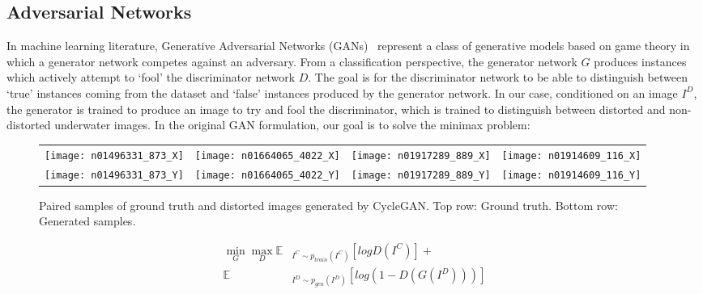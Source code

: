 \subsection{Adversarial Networks}
\label{sec:gans}
In machine learning literature, Generative Adversarial Networks 
(GANs)~\cite{goodfellow2014generative} represent a class of generative models based on game theory in which a generator network 
competes against an adversary. From a classification perspective, the generator network $G$ produces instances which actively 
attempt 
to `fool' the discriminator network $D$. The goal is for the discriminator network to be able to distinguish between `true' 
instances coming from the dataset and `false' instances produced by the generator network.
In our case, conditioned on an image $I^D$, the generator is trained to produce an image to try and fool the 
discriminator, which is trained to distinguish between distorted and non-distorted underwater images. In the original
GAN formulation, our goal is to solve the minimax problem:

\begin{figure}
\vspace{2mm}
\centering
\begin{tabular}{p{1.7cm} p{1.7cm} p{1.7cm} p{1.7cm}}
   
   \texttt{[image: n01496331\_873\_X]} &
   \texttt{[image: n01664065\_4022\_X]} &
   \texttt{[image: n01917289\_889\_X]} &
   \texttt{[image: n01914609\_116\_X]} \\
   \texttt{[image: n01496331\_873\_Y]} &
   \texttt{[image: n01664065\_4022\_Y]} &
   \texttt{[image: n01917289\_889\_Y]} &
   \texttt{[image: n01914609\_116\_Y]} \\

\end{tabular}
\caption{Paired samples of ground truth and distorted images generated by CycleGAN. Top row: Ground truth.
Bottom row: Generated samples.}
\label{fig:cgan_samples}
\vspace{-5mm}
\end{figure}


\begin{equation}
\begin{aligned}
   \min\limits_{G}\max\limits_{D} \mathbb{E} & _{I^C \sim p_{train}(I^C)} [logD(I^C)] + \\
   \mathbb{E} & _{I^D \sim p_{gen}(I^D)}[log(1 - D(G(I^D)))]
\end{aligned}
\end{equation}

